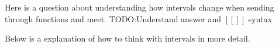 \documentclass[a5paper]{article}
\begin{document}
Here is a question about understanding how intervals change when sending through functions and meet.
TODO:\@ Understand answer and \([[]]\) syntax

\begin{figure}[ht]
	\centering
	\vspace{-10pt}
	\vspace{-10pt}
\end{figure}

Below is a explanation of how to think with intervals in more detail.
\begin{figure}[ht]
	\centering
	\vspace{-10pt}
	\vspace{-30pt}
\end{figure}
\end{document}

